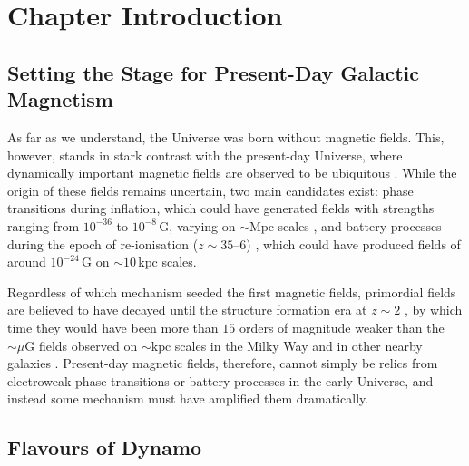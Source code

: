\section{Chapter Introduction}

\subsection{Setting the Stage for Present-Day Galactic Magnetism}

As far as we understand, the Universe was born without magnetic fields. This, however, stands in stark contrast with the present-day Universe, where dynamically important magnetic fields are observed to be ubiquitous \citep[see][for recent reviews on magnetic fields in galaxies and their impact on star formation]{krumholz2019role, brandenburg2023galactic}. While the origin of these fields remains uncertain, two main candidates exist: phase transitions during inflation, which could have generated fields with strengths ranging from $10^{-36}$ to $10^{-8} \,\mathrm{G}$, varying on $\sim \mathrm{Mpc}$ scales \citep{quashnock1989magnetic, sigl1997primordial, kahniashvili2013evolution}, and battery processes during the epoch of re-ionisation ($z \sim 35$--$6$) \citep{biermann1950ursprung, naoz2013generation}, which could have produced fields of around $10^{-24} \,\mathrm{G}$ on $\sim 10 \,\mathrm{kpc}$ scales.

Regardless of which mechanism seeded the first magnetic fields, primordial fields are believed to have decayed until the structure formation era at $z \sim 2$ \citep[\eg][]{brandenburg2017evolution, vachaspati2021progress, hosking2022cosmic, mtchedlidze2022evolution, mtchedlidze2023inflationary, Hosking2023_cosmic_voids_nature}, by which time they would have been more than $15$ orders of magnitude weaker than the $\sim \mu\mathrm{G}$ fields observed on $\sim \mathrm{kpc}$ scales in the Milky Way and in other nearby galaxies \citep[\eg][]{kulsrud1997protogalactic, beck2019synthesizing, shah2021magnetic, lopez2022extragalactic}. Present-day magnetic fields, therefore, cannot simply be relics from electroweak phase transitions or battery processes in the early Universe, and instead some mechanism must have amplified them dramatically.

\subsection{Flavours of Dynamo}

